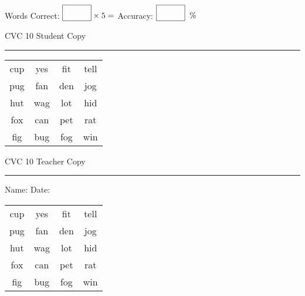 \documentclass{memoir}
\begin{document}
\small

Words Correct: $\fbox{\phantom{\huge 100}} \times 5 = $ Accuracy: $\fbox{\phantom{\huge 100}}\;\; \%$ 

\vfill

\newpage


\footnotesize \noindent
CVC 10 \hfill Student Copy
\smallskip
\hrule

\Large

\setlength{\tabcolsep}{14pt}
\def\arraystretch{2}

{\selectfont


\begin{vplace}[0.5]
\begin{center}
\begin{tabular}{cccc}
cup & yes & fit & tell \\
pug & fan & den & jog \\
hut & wag & lot & hid \\
fox & can & pet & rat \\
fig & bug & fog & win \\
\end{tabular}
\end{center}
\end{vplace}

}

\newpage

\footnotesize \noindent
CVC 10 \hfill Teacher Copy
\smallskip
\hrule

\small

\vfill

\noindent
Name: \underline{\hspace{1.75in}} \hfill Date: \underline{\hspace{1in}}

\Large

{\selectfont


\begin{vplace}[0.5]
\begin{center}
\begin{tabular}{cccc}
cup & yes & fit & tell \\
pug & fan & den & jog \\
hut & wag & lot & hid \\
fox & can & pet & rat \\
fig & bug & fog & win \\
\end{tabular}
\end{center}
\end{vplace}



}
\end{document}
